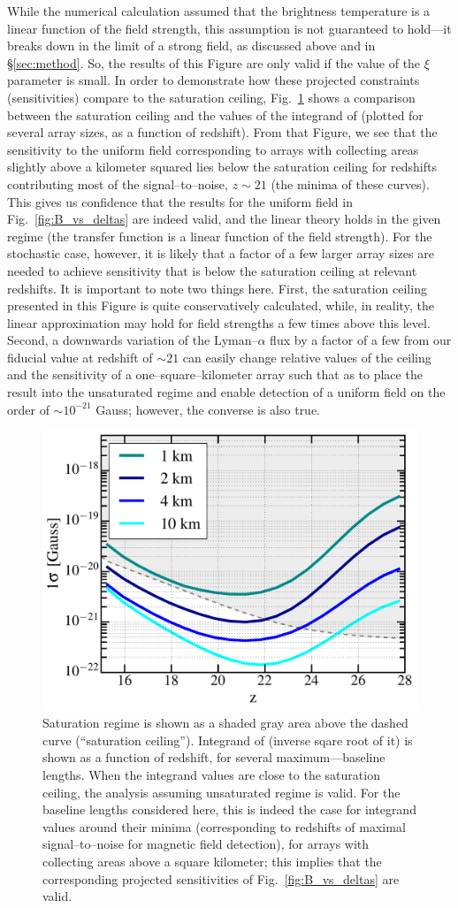 While the numerical calculation assumed that the brightness temperature is a linear function of the field strength, this assumption is not guaranteed to hold---it breaks down in the limit of a strong field, as discussed above and in \S\ref{sec:method}. So, the results of this Figure are only valid if the value of the $\xi$ parameter is small. In order to demonstrate how these projected constraints (sensitivities) compare to the saturation ceiling, Fig.~\ref{fig:Bsat} shows a comparison between the saturation ceiling and the values of the integrand of \eq{\ref{eq:fisher_patch}} (plotted for several array sizes, as a function of redshift). From that Figure, we see that the sensitivity to the uniform field corresponding to arrays with collecting areas slightly above a kilometer squared lies below the saturation ceiling for redshifts contributing most of the signal--to--noise, $z\sim21$ (the minima of these curves). This gives us confidence that the results for the uniform field in Fig.~\ref{fig:B_vs_deltas} are indeed valid, and the linear theory holds in the given regime (the transfer function is a linear function of the field strength). For the stochastic case, however, it is likely that a factor of a few larger array sizes are needed to achieve sensitivity that is below the saturation ceiling at relevant redshifts. It is important to note two things here. First, the saturation ceiling presented in this Figure is quite conservatively calculated, while, in reality, the linear approximation may hold for field strengths a few times above this level. Second, a downwards variation of the Lyman--$\alpha$ flux by a factor of a few from our fiducial value at redshift of $\sim 21$ can easily change relative values of the ceiling and the sensitivity of a one--square--kilometer array such that as to place the result into the unsaturated regime and enable detection of a uniform field on the order of $\sim 10^{-21}$ Gauss; however, the converse is also true.
\begin{figure}
\centering
\includegraphics[width=.35\textwidth,keepaspectratio=true]{sigmaB0_vs_z.pdf}
\caption{Saturation regime is shown as a shaded gray area above the dashed curve (``saturation ceiling''). Integrand of \eq{\ref{eq:fisher_patch}} (inverse sqare root of it) is shown as a function of redshift, for several maximum---baseline lengths.  When the integrand values are close to the saturation ceiling, the analysis assuming unsaturated regime is valid. For the baseline lengths considered here, this is indeed the case for integrand values around their minima (corresponding to redshifts of maximal signal--to--noise for magnetic field detection), for arrays with collecting areas above a square kilometer; this implies that the corresponding projected sensitivities of Fig.~\ref{fig:B_vs_deltas} are valid. \label{fig:Bsat}}
\end{figure}
